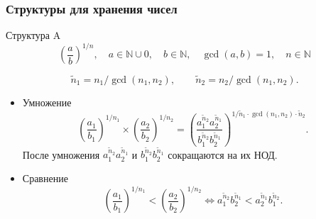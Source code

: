 \documentclass[ucs, notheorems, handout]{beamer}
\begin{document}
\begin{frame}
    \frametitle{Структуры для хранения чисел}
    \begin{block}{Структура A}
        $$\displaystyle \left(\frac{a}{b}\right)^{1/n}, \quad a \in \mathbb{N} \cup 0, \quad b \in \mathbb{N}, \quad \gcd(a, b) = 1, \quad n \in \mathbb{N}$$
    \end{block}
    $$\tilde{n}_1 = n_1 / \gcd(n_1, n_2), \qquad \tilde{n}_2 = n_2 / \gcd(n_1, n_2).$$
    \begin{itemize}
        \item Умножение
        $$ \left(\frac{a_1}{b_1}\right)^{1/n_1} \times \left(\frac{a_2}{b_2}\right)^{1/n_2} = \left(\frac{a_1^{\tilde{n}_2}a_2^{\tilde{n}_1}}{b_1^{\tilde{n}_2}b_2^{\tilde{n}_1}}\right)^{1/\tilde{n}_1\cdot \gcd(n_1, n_2) \cdot \tilde{n}_2}.$$
        После умножения $a_1^{\tilde{n}_2}a_2^{\tilde{n}_1}$ и $b_1^{\tilde{n}_2}b_2^{\tilde{n}_1}$ сокращаются на их НОД.
        \item Сравнение
        $$ \left(\frac{a_1}{b_1}\right)^{1/n_1} < \left(\frac{a_2}{b_2}\right)^{1/n_2} \Leftrightarrow
        {a_1^{\tilde{n}_2}}{b_2^{\tilde{n}_1}} < {a_2^{\tilde{n}_1}}{b_1^{\tilde{n}_2}}.$$
    \end{itemize}

\end{frame}
\end{document}
